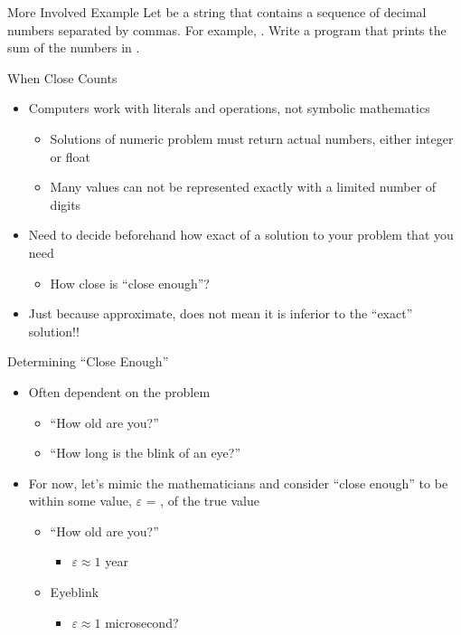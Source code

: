 \documentclass[pdf, aspectratio=169, 12pt]{beamer}
\begin{document}
\begin{frame}{More Involved Example}
	Let  be a string that contains a sequence of decimal numbers separated by commas. For example, . Write a program that prints the sum of the numbers in .
\end{frame}

\begin{frame}{When Close Counts}
	\begin{itemize}[<+->]
		\item Computers work with literals and operations, not symbolic mathematics
			\begin{itemize}
				\item Solutions of numeric problem must return actual numbers, either integer or float
				\item Many values can not be represented exactly with a limited number of digits 
			\end{itemize}
		\item Need to decide beforehand how exact of a solution to your problem that you need
			\begin{itemize}
				\item How close is ``close enough''?
			\end{itemize}
			
		\item Just because approximate, does not mean it is inferior to the ``exact'' solution!!
	\end{itemize}
\end{frame}

\begin{frame}{Determining ``Close Enough''}
	\begin{itemize}[<+->]
		\item Often dependent on the problem
			\begin{itemize}
				\item ``How old are you?''
				\item ``How long is the blink of an eye?''
			\end{itemize}
		\item For now, let's mimic the mathematicians and consider ``close enough'' to be within some value, $\varepsilon$ = , of the true value
			\begin{itemize}
				\item ``How old are you?''
					\begin{itemize}
						\item $\varepsilon \approx 1$ year
					\end{itemize}
				\item Eyeblink
					\begin{itemize}
						\item $\varepsilon \approx 1$ microsecond?
					\end{itemize}
			\end{itemize}
	\end{itemize}
\end{frame}
\end{document}
